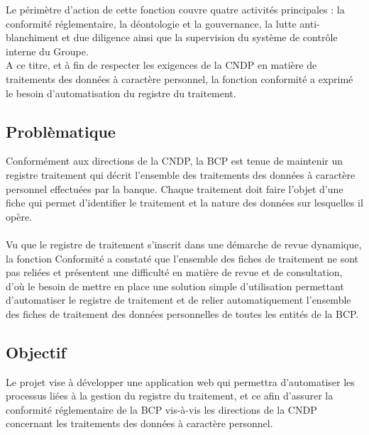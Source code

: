 \noindent Le périmètre d'action de cette fonction couvre quatre activités principales : la conformité réglementaire, la déontologie et la gouvernance, la lutte anti-blanchiment et due diligence ainsi que la supervision du système de contrôle interne du Groupe.\\

\noindent A ce titre, et à fin de respecter les exigences de la CNDP en matière de traitements des données à caractère personnel, la fonction conformité a exprimé le besoin d'automatisation du registre du traitement.

\subsection{Problèmatique}
Conformément aux directions de la CNDP, la BCP est tenue de maintenir un registre traitement qui décrit l'ensemble des traitements des données à caractère personnel effectuées par la banque. Chaque traitement doit faire l'objet d'une fiche qui permet d'identifier le traitement et la nature des données sur lesquelles il opère. \\ \\
Vu que le registre de traitement s'inscrit dans une démarche de revue dynamique, la fonction Conformité a constaté que l'ensemble des fiches de traitement ne sont pas reliées et présentent une difficulté en matière de revue et de consultation, d'où le besoin de mettre en place une solution simple d'utilisation permettant d'automatiser le registre de traitement et de relier automatiquement l'ensemble des fiches de traitement des données personnelles de toutes les entités de la BCP.

\subsection{Objectif}
Le projet vise à développer une application web qui permettra d'automatiser les processus liées à la gestion du registre du traitement, et ce afin d'assurer la conformité réglementaire de la BCP vis-à-vis les directions de la CNDP concernant les traitements des données à caractère personnel. 

